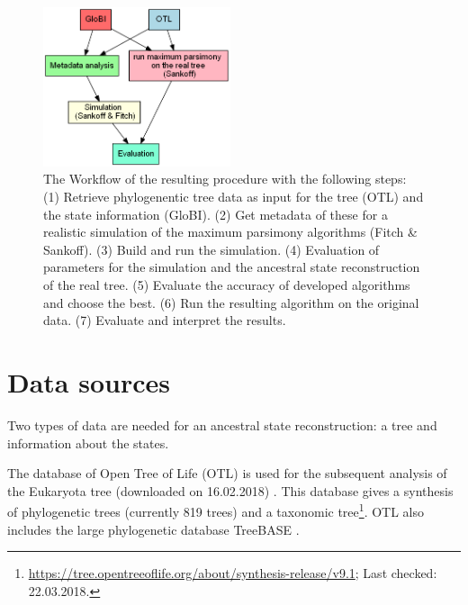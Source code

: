   \begin{figure}[h!]
    \centering
    \includegraphics[width=0.49\textwidth]{Figures/Workflow-overview.png}
    \caption{The Workflow of the resulting procedure with the following steps: \\
      (1) Retrieve phylogenentic tree data as input for the tree (OTL) and the state information (GloBI).
      (2) Get metadata of these for a realistic simulation of the maximum parsimony algorithms (Fitch \& Sankoff).
      (3) Build and run the simulation.
      (4) Evaluation of parameters for the simulation and the ancestral state reconstruction of the real tree.
      (5) Evaluate the accuracy of developed algorithms and choose the best.
      (6) Run the resulting algorithm on the original data.
      (7) Evaluate and interpret the results.
    }
    \label{fig:workflow}
  \end{figure}
  
  \section{Data sources}
    Two types of data are needed for an ancestral state reconstruction: a tree and information about 
      the states.

    The database of Open Tree of Life (OTL) is used for the subsequent analysis of the Eukaryota tree
      (downloaded on 16.02.2018) \cite{Hinchliff2015}. This database gives a synthesis of phylogenetic 
      trees (currently 819 trees) and a taxonomic tree\footnote{
        \hyperlink{https://tree.opentreeoflife.org/about/synthesis-release/v9.1}
        {https://tree.opentreeoflife.org/about/synthesis-release/v9.1}; Last checked: 22.03.2018.
      }. OTL also includes the large phylogenetic database TreeBASE \cite{Hinchliff2015}.
      
